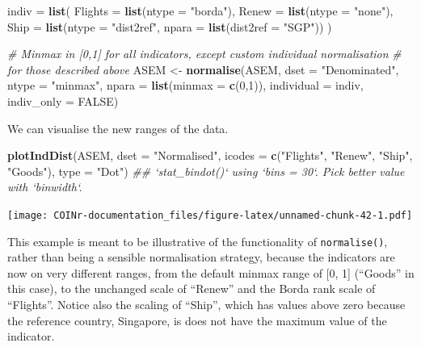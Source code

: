 \documentclass[
]{book}
\newenvironment{Shaded}{\begin{snugshade}}{\end{snugshade}}
\newcommand{\CommentTok}[1]{\textcolor[rgb]{0.56,0.35,0.01}{\textit{#1}}}
\newcommand{\DataTypeTok}[1]{\textcolor[rgb]{0.13,0.29,0.53}{#1}}
\newcommand{\DecValTok}[1]{\textcolor[rgb]{0.00,0.00,0.81}{#1}}
\newcommand{\KeywordTok}[1]{\textcolor[rgb]{0.13,0.29,0.53}{\textbf{#1}}}
\newcommand{\NormalTok}[1]{#1}
\newcommand{\OtherTok}[1]{\textcolor[rgb]{0.56,0.35,0.01}{#1}}
\newcommand{\StringTok}[1]{\textcolor[rgb]{0.31,0.60,0.02}{#1}}
\begin{document}
\begin{Shaded}
\begin{Highlighting}[]
\NormalTok{indiv =}\StringTok{ }\KeywordTok{list}\NormalTok{(}
  \DataTypeTok{Flights =} \KeywordTok{list}\NormalTok{(}\DataTypeTok{ntype =} \StringTok{"borda"}\NormalTok{),}
  \DataTypeTok{Renew =} \KeywordTok{list}\NormalTok{(}\DataTypeTok{ntype =} \StringTok{"none"}\NormalTok{),}
  \DataTypeTok{Ship =} \KeywordTok{list}\NormalTok{(}\DataTypeTok{ntype =} \StringTok{"dist2ref"}\NormalTok{, }\DataTypeTok{npara =} \KeywordTok{list}\NormalTok{(}\DataTypeTok{dist2ref =} \StringTok{"SGP"}\NormalTok{))}
\NormalTok{)}

\CommentTok{# Minmax in [0,1] for all indicators, except custom individual normalisation}
\CommentTok{# for those described above}
\NormalTok{ASEM <-}\StringTok{ }\KeywordTok{normalise}\NormalTok{(ASEM, }\DataTypeTok{dset =} \StringTok{"Denominated"}\NormalTok{, }\DataTypeTok{ntype =} \StringTok{"minmax"}\NormalTok{, }\DataTypeTok{npara =} \KeywordTok{list}\NormalTok{(}\DataTypeTok{minmax =} \KeywordTok{c}\NormalTok{(}\DecValTok{0}\NormalTok{,}\DecValTok{1}\NormalTok{)),}
                  \DataTypeTok{individual =}\NormalTok{ indiv, }\DataTypeTok{indiv_only =} \OtherTok{FALSE}\NormalTok{)}
\end{Highlighting}
\end{Shaded}

We can visualise the new ranges of the data.

\begin{Shaded}
\begin{Highlighting}[]
\KeywordTok{plotIndDist}\NormalTok{(ASEM, }\DataTypeTok{dset =} \StringTok{"Normalised"}\NormalTok{,}
            \DataTypeTok{icodes =} \KeywordTok{c}\NormalTok{(}\StringTok{"Flights"}\NormalTok{, }\StringTok{"Renew"}\NormalTok{, }\StringTok{"Ship"}\NormalTok{, }\StringTok{"Goods"}\NormalTok{), }\DataTypeTok{type =} \StringTok{"Dot"}\NormalTok{)}
\CommentTok{## `stat_bindot()` using `bins = 30`. Pick better value with `binwidth`.}
\end{Highlighting}
\end{Shaded}

\texttt{[image: COINr-documentation\_files/figure-latex/unnamed-chunk-42-1.pdf]}

This example is meant to be illustrative of the functionality of \texttt{normalise()}, rather than being a sensible normalisation strategy, because the indicators are now on very different ranges, from the default minmax range of {[}0, 1{]} (``Goods'' in this case), to the unchanged scale of ``Renew'' and the Borda rank scale of ``Flights''. Notice also the scaling of ``Ship'', which has values above zero because the reference country, Singapore, is does not have the maximum value of the indicator.
\end{document}
